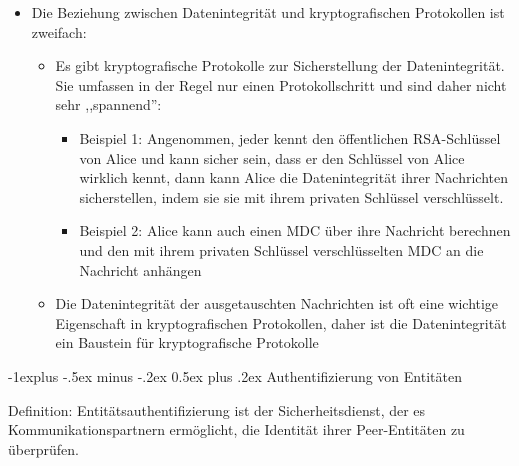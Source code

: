 \documentclass[a4paper]{article}
\makeatletter
\renewcommand{\subsection}{\@startsection{subsection}{2}{0mm}%
 {-1explus -.5ex minus -.2ex}%
 {0.5ex plus .2ex}%
 {\normalfont\normalsize\bfseries}}
\makeatother
\begin{document}
\begin{multicols}{3}
    \begin{itemize}
        \item
              Die Beziehung zwischen Datenintegrität und kryptografischen
              Protokollen ist zweifach:

              \begin{itemize}
                  \item
                        Es gibt kryptografische Protokolle zur Sicherstellung der
                        Datenintegrität. Sie umfassen in der Regel nur einen
                        Protokollschritt und sind daher nicht sehr ,,spannend'':

                        \begin{itemize}
                            \item
                                  Beispiel 1: Angenommen, jeder kennt den öffentlichen RSA-Schlüssel
                                  von Alice und kann sicher sein, dass er den Schlüssel von Alice
                                  wirklich kennt, dann kann Alice die Datenintegrität ihrer
                                  Nachrichten sicherstellen, indem sie sie mit ihrem privaten
                                  Schlüssel verschlüsselt.
                            \item
                                  Beispiel 2: Alice kann auch einen MDC über ihre Nachricht
                                  berechnen und den mit ihrem privaten Schlüssel verschlüsselten MDC
                                  an die Nachricht anhängen
                        \end{itemize}
                  \item
                        Die Datenintegrität der ausgetauschten Nachrichten ist oft eine
                        wichtige Eigenschaft in kryptografischen Protokollen, daher ist die
                        Datenintegrität ein Baustein für kryptografische Protokolle
              \end{itemize}
    \end{itemize}


    \subsection{Authentifizierung von
        Entitäten}

    Definition: Entitätsauthentifizierung ist der Sicherheitsdienst, der es
    Kommunikationspartnern ermöglicht, die Identität ihrer Peer-Entitäten zu
    überprüfen.


\end{multicols}
\end{document}
